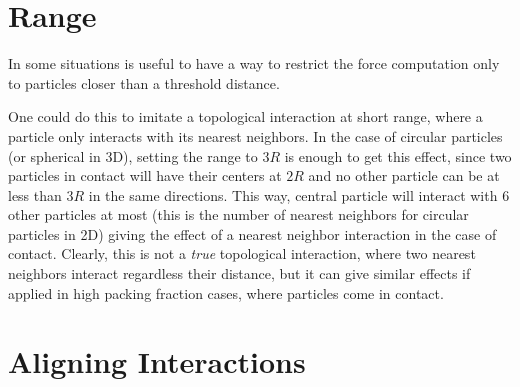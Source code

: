 \documentclass[../../master_thesis_np.tex]{subfiles}
\begin{document}
	\section{Range}
	In some situations is useful to have a way to restrict the force computation only to particles closer than a threshold distance.
	
	One could do this to imitate a topological interaction at short range, where a particle only interacts with its nearest neighbors. In the case of circular particles (or spherical in 3D), setting the range to $3R$ is enough to get this effect, since two particles in contact will have their centers at $2R$ and no other particle can be at less than $3R$ in the same directions. This way, central particle will interact with 6 other particles at most (this is the number of nearest neighbors for circular particles in 2D) giving the effect of a nearest neighbor interaction in the case of contact. Clearly, this is not a \emph{true} topological interaction, where two nearest neighbors interact regardless their distance, but it can give similar effects if applied in high packing fraction cases, where particles come in contact.
	
	
	
	\section{Aligning Interactions}
\end{document}
